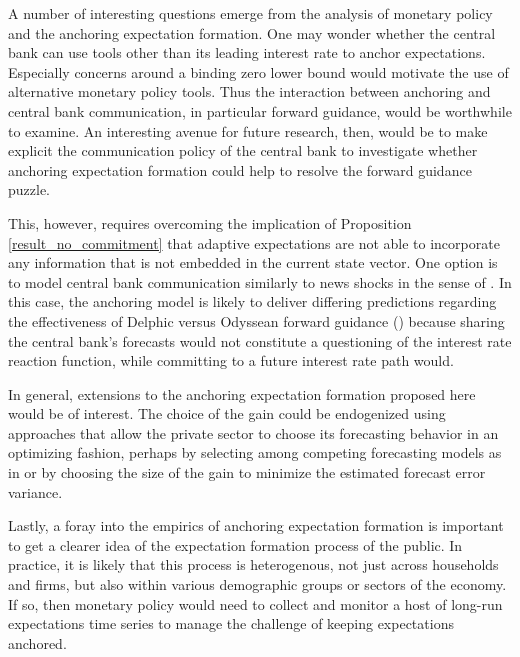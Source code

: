 \documentclass[11pt]{article}
\def \myBibPath {../../literature/}
\renewcommand{\[}{\begin{equation}}
\renewcommand{\]}{\end{equation}}
\begin{document}
A number of interesting questions emerge from the analysis of monetary policy and the anchoring expectation formation. One may wonder whether the central bank can use tools other than its leading interest rate to anchor expectations. Especially concerns around a binding zero lower bound would motivate the use of alternative monetary policy tools. Thus the interaction between anchoring and central bank communication, in particular forward guidance, would be worthwhile to examine. An interesting avenue for future research, then, would be to make explicit the communication policy of the central bank to investigate whether anchoring expectation formation could help to resolve the forward guidance puzzle. 

This, however, requires overcoming the implication of Proposition \ref{result_no_commitment} that adaptive expectations are not able to incorporate any information that is not embedded in the current state vector. One option is to model central bank communication similarly to news shocks in the sense of \cite{beaudry2006stock}. In this case, the anchoring model is likely to deliver differing predictions regarding the effectiveness of Delphic versus Odyssean forward guidance (\cite{campbell2012macroeconomic}) because sharing the central bank's forecasts would not constitute a questioning of the interest rate reaction function, while committing to a future interest rate path would.

In general, extensions to the anchoring expectation formation proposed here would be of interest. The choice of the gain could be endogenized using approaches that allow the private sector to choose its forecasting behavior in an optimizing fashion, perhaps by selecting among competing forecasting models as in \cite{Branch2011} or by choosing the size of the gain to minimize the estimated forecast error variance. 

Lastly, a foray into the empirics of anchoring expectation formation is important to get a clearer idea of the expectation formation process of the public. In practice, it is likely that this process is heterogenous, not just across households and firms, but also within various demographic groups or sectors of the economy. If so, then monetary policy would need to collect and monitor a host of long-run expectations time series to manage the challenge of keeping expectations anchored. 



\clearpage
\newpage


\end{document}

